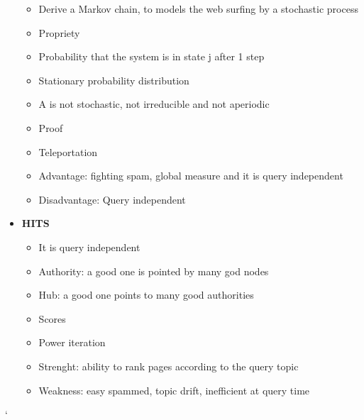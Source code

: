 \begin{itemize}
\begin{itemize}
        \item Derive a Markov chain, to models the web surfing by a stochastic process
        \item Propriety
        \item Probability that the system is in state j after 1 step
        \item Stationary probability distribution
        \item A is not stochastic, not irreducible and not aperiodic
        \item Proof
        \item Teleportation
        \item Advantage: fighting spam, global measure and it is query independent
        \item Disadvantage: Query independent
    \end{itemize}
    \item \textbf{HITS}
    \begin{itemize}
        \item It is query independent
        \item Authority: a good one is pointed by many god nodes
        \item Hub: a good one points to many good authorities
        \item Scores
        \item Power iteration
        \item Strenght: ability to rank pages according to the query topic
        \item Weakness: easy spammed, topic drift, inefficient at query time
    \end{itemize}
\end{itemize}
`
